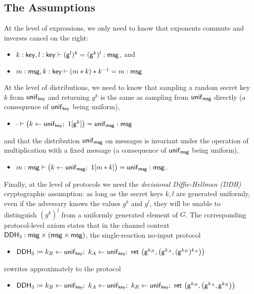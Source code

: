 \subsection{The Assumptions}
At the level of expressions, we only need to know that exponents commute and inverses cancel on the right:
\begin{itemize}
\item $k : \mathsf{key}, l : \mathsf{key} \vdash (\mathsf{g}^l)^k = (\mathsf{g}^k)^l : \mathsf{msg}$, and
\item $m : \mathsf{msg}, k : \mathsf{key} \vdash (m * k) * k^{-1} = m : \mathsf{msg}$
\end{itemize}
At the level of distributions, we need to know that sampling a random secret key $k$ from $\mathsf{unif}_{\mathsf{key}}$ and returning $g^k$ is the same as sampling from $\mathsf{unif}_{\mathsf{msg}}$ directly (a consequence of $\mathsf{unif}_{\mathsf{key}}$ being uniform),
\begin{itemize}
\item $\cdot \vdash \big(k \leftarrow \mathsf{unif}_{\mathsf{key}}; \ 1[\mathsf{g}^k]\big) = \mathsf{unif}_{\mathsf{msg}} : \mathsf{msg}$
\end{itemize}
and that the distribution $\mathsf{unif}_{\mathsf{msg}}$ on messages is invariant under the operation of multiplication with a fixed message (a consequence of $\mathsf{unif}_{\mathsf{msg}}$ being uniform),
\begin{itemize}
\item $m : \mathsf{msg} \vdash \big(k \leftarrow \mathsf{unif}_{\mathsf{msg}}; \ 1[ m * k]\big) = \mathsf{unif}_{\mathsf{msg}} : \mathsf{msg}$.
\end{itemize}
Finally, at the level of protocols we need the \emph{decisional Diffie-Hellman (DDH)} cryptographic assumption: as long as the secret keys $k,l$ are generated uniformly, even if the adversary knows the values $g^k$ and $g^l$, they will be unable to distinguish $(g^k)^l$ from a uniformly generated element of $G$. The corresponding protocol-level axiom states that in the channel context $\mathsf{DDH}_3 : \mathsf{msg} \times (\mathsf{msg} \times \mathsf{msg})$, the single-reaction no-input protocol
\begin{itemize}
\item $\mathsf{DDH}_3 \coloneqq k_B \leftarrow \mathsf{unif}_{\mathsf{key}}; \ k_A \leftarrow \mathsf{unif}_{\mathsf{key}}; \ \mathsf{ret} \ \big(\mathsf{g}^{k_B}, \big(\mathsf{g}^{k_A}, (\mathsf{g}^{k_B})^{k_A}\big)\big)$
\end{itemize}
rewrites approximately to the protocol
\begin{itemize}
\item $\DDH_3 \coloneqq k_B \leftarrow \unif_\key; \ k_A \leftarrow \unif_\key; \ k_R \leftarrow \unif_\key; \ \ret{\big(\gen^{k_B}, \big(\gen^{k_A}, \gen^{k_R}\big)\big)}$
\end{itemize}

